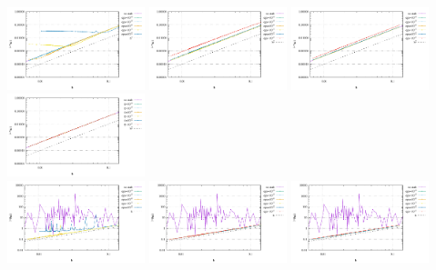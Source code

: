 \begin{center}
\includegraphics[width=4cm]{python_codes/fieldstone_115/results/buha06/errorsV_penalty.pdf}
\includegraphics[width=4cm]{python_codes/fieldstone_115/results/buha06/errorsV_global.pdf}
\includegraphics[width=4cm]{python_codes/fieldstone_115/results/buha06/errorsV_local.pdf}
\includegraphics[width=4cm]{python_codes/fieldstone_115/results/buha06/errorsV_macro.pdf}\\
\includegraphics[width=4cm]{python_codes/fieldstone_115/results/buha06/errorsP_penalty.pdf}
\includegraphics[width=4cm]{python_codes/fieldstone_115/results/buha06/errorsP_global.pdf}
\includegraphics[width=4cm]{python_codes/fieldstone_115/results/buha06/errorsP_local.pdf}

\end{center}
